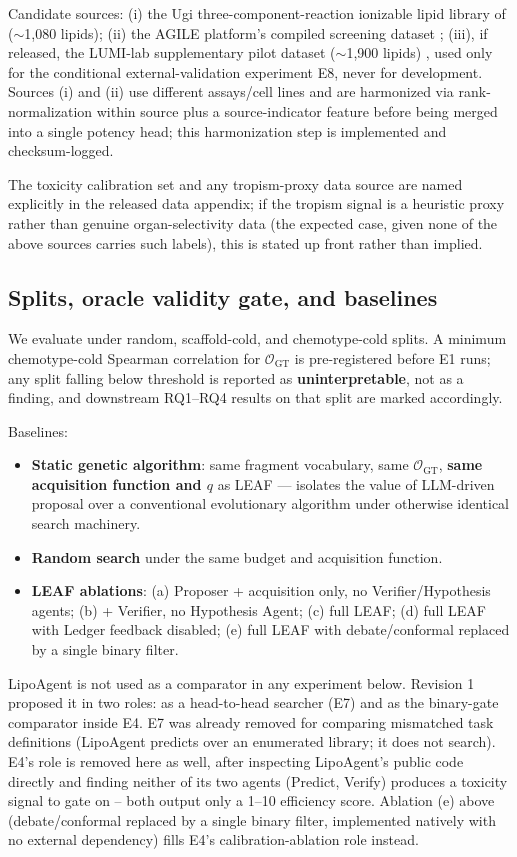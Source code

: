 \documentclass{article}
\begin{document}
Candidate sources: (i) the Ugi three-component-reaction ionizable lipid
library of \citet{xu2023ugi} ($\sim$1,080 lipids); (ii) the AGILE
platform's compiled screening dataset \citep{xu2024agile}; (iii), if
released, the LUMI-lab supplementary pilot dataset ($\sim$1,900 lipids)
\citep{lumilab2026}, used only for the conditional external-validation
experiment E8, never for development. Sources (i) and (ii) use different
assays/cell lines and are harmonized via rank-normalization within source
plus a source-indicator feature before being merged into a single potency
head; this harmonization step is implemented and checksum-logged.

The toxicity calibration set and any tropism-proxy data source are named
explicitly in the released data appendix; if the tropism signal is a
heuristic proxy rather than genuine organ-selectivity data (the expected
case, given none of the above sources carries such labels), this is stated
up front rather than implied.

\subsection{Splits, oracle validity gate, and baselines}

We evaluate under random, scaffold-cold, and chemotype-cold splits. A
minimum chemotype-cold Spearman correlation for $\mathcal{O}_{\text{GT}}$
is pre-registered before E1 runs; any split falling below threshold is
reported as \textbf{uninterpretable}, not as a finding, and downstream
RQ1--RQ4 results on that split are marked accordingly.

Baselines:
\begin{itemize}
\item \textbf{Static genetic algorithm}: same fragment vocabulary,
same $\mathcal{O}_{\text{GT}}$, \textbf{same acquisition function and $q$}
as LEAF --- isolates the value of LLM-driven proposal over a conventional
evolutionary algorithm under otherwise identical search machinery.
\item \textbf{Random search} under the same budget and acquisition
function.
\item \textbf{LEAF ablations}: (a) Proposer + acquisition only, no
Verifier/Hypothesis agents; (b) + Verifier, no Hypothesis Agent; (c) full
LEAF; (d) full LEAF with Ledger feedback disabled; (e) full LEAF with
debate/conformal replaced by a single binary filter.
\end{itemize}

LipoAgent \citep{li2025lipoagent} is not used as a comparator in any
experiment below. Revision 1 proposed it in two roles: as a head-to-head
searcher (E7) and as the binary-gate comparator inside E4. E7 was already
removed for comparing mismatched task definitions (LipoAgent predicts over
an enumerated library; it does not search). E4's role is removed here as
well, after inspecting LipoAgent's public code directly and finding
neither of its two agents (Predict, Verify) produces a toxicity signal to
gate on -- both output only a 1--10 efficiency score. Ablation (e) above
(debate/conformal replaced by a single binary filter, implemented natively
with no external dependency) fills E4's calibration-ablation role instead.
\end{document}
